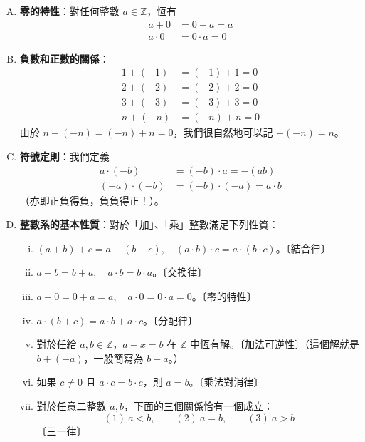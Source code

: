 \begin{enumerate}[(A)]
  \item \textbf{零的特性}：對任何整數 $a \in \mathbb{Z}$，恆有
  \begin{align*}
    a + 0 &= 0 + a = a \\
    a \cdot 0 &= 0 \cdot a = 0
  \end{align*}
  \item \textbf{負數和正數的關係}：
  \begin{align*}
    1 + (-1) &= (-1) + 1 = 0 \\
    2 + (-2) &= (-2) + 2 = 0 \\
    3 + (-3) &= (-3) + 3 = 0 \\
    n + (-n) &= (-n) + n = 0
  \end{align*}
  由於 $n + (-n) = (-n) + n = 0$，我們很自然地可以記 $-(-n) = n$。
  \item \textbf{符號定則}：我們定義
  \begin{align*}
    a \cdot (-b) &= (-b) \cdot a = -(ab) \\
    (-a) \cdot (-b) &= (-b) \cdot (-a) = a \cdot b
  \end{align*}
  （亦即正負得負，負負得正！）。
  \item \textbf{整數系的基本性質}：對於「加」、「乘」整數滿足下列性質：
  \begin{enumerate}[(i)]
    \item $(a+b)+c = a+(b+c), \quad (a \cdot b) \cdot c = a \cdot (b \cdot c)$。〔結合律〕
    \item $a+b = b+a, \quad a \cdot b = b \cdot a$。〔交換律〕
    \item $a+0 = 0+a = a, \quad a \cdot 0 = 0 \cdot a = 0$。〔零的特性〕
    \item $a \cdot (b+c) = a \cdot b + a \cdot c$。〔分配律〕
    \item 對於任給 $a, b \in \mathbb{Z}$，$a+x=b$ 在 $\mathbb{Z}$ 中恆有解。〔加法可逆性〕（這個解就是 $b + (-a)$，一般簡寫為 $b-a$。）
    \item 如果 $c \neq 0$ 且 $a \cdot c = b \cdot c$，則 $a = b$。〔乘法對消律〕
    \item 對於任意二整數 $a, b$，下面的三個關係恰有一個成立：
    \begin{equation*}
      (1)\ a < b, \qquad (2)\ a = b, \qquad (3)\ a > b
    \end{equation*}
    〔三一律〕
  \end{enumerate}
\end{enumerate}

